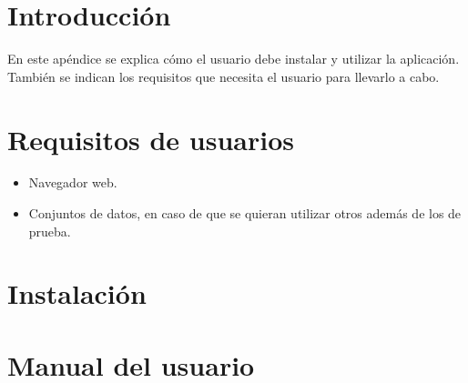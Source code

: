 
\section{Introducción}
En este apéndice se explica cómo el usuario debe instalar y utilizar la aplicación. También se indican los requisitos que necesita el usuario para llevarlo a cabo.

\section{Requisitos de usuarios}
\begin{itemize}
\tightlist
\item Navegador web.
\item Conjuntos de datos, en caso de que se quieran utilizar otros además de los de prueba.
\end{itemize}

\section{Instalación}

\section{Manual del usuario}


